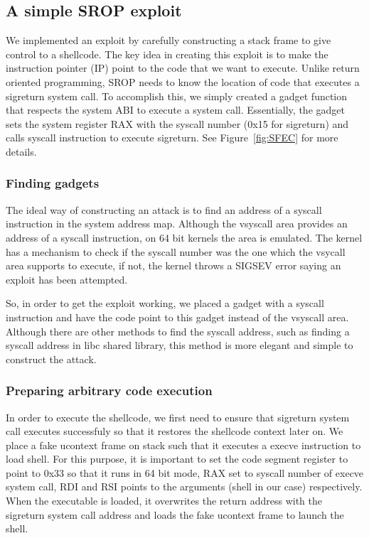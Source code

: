 \documentclass{sig-alternate-05-2015}
\begin{document}
\subsection{A simple SROP exploit}
We implemented an exploit by carefully constructing a stack frame to give
control to a shellcode. The key idea in creating this exploit is to make
the instruction pointer (IP) point to the code that we want to execute. 
Unlike return oriented programming, SROP needs to know the location of 
code that executes a sigreturn system call. To accomplish this, we simply
created a gadget function that respects the system ABI to execute a system
call. Essentially, the gadget sets the system register RAX with the syscall
number (0x15 for sigreturn) and calls syscall instruction to execute sigreturn.
See Figure~\ref{fig:SFEC} for more details.

\subsubsection{Finding gadgets}
\par The ideal way of constructing an attack is to find an address of a
syscall instruction in the system address map. Although the vsyscall area provides 
an address of a syscall instruction, on 64 bit kernels the area is emulated. 
The kernel has a mechanism to check if the syscall number was the one which the 
vsycall area supports to execute, if not, the kernel throws a SIGSEV error 
saying an exploit has been attempted.  
\par So, in order to get the exploit working, we placed a gadget with a syscall 
instruction and have the code point to this gadget instead of the vsyscall area.
Although there are other methods to find the syscall address, such as finding a 
syscall address in libc shared library, this method is more elegant and simple to 
construct the attack.

\subsubsection{Preparing arbitrary code execution}
In order to execute the shellcode, we first need to ensure that sigreturn system
call executes successfuly so that it restores the shellcode context later on. We
place a fake ucontext frame on stack such that it executes a execve instruction to
load shell. For this purpose, it is important to set the code segment register to 
point to 0x33 so that it runs in 64 bit mode, RAX set to syscall number of execve
system call, RDI and RSI points to the arguments (shell in our case) respectively.
When the executable is loaded, it overwrites the return address with the sigreturn
system call address and loads the fake ucontext frame to launch the shell.
\end{document}
